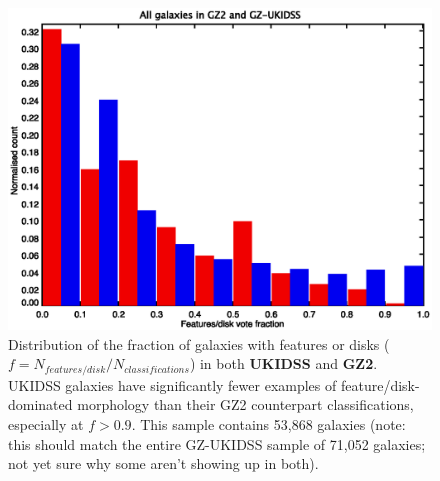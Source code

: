 \documentclass[useAMS,usenatbib]{mn2e}
\begin{document}

\begin{figure}
\includegraphics[scale=1.0]{figures/features_histogram.eps}
\caption{
    Distribution of the fraction of galaxies with features or disks ($f = N_{features/disk}/N_{classifications}$) in both {\bf\color{red}UKIDSS} and {\bf\color{blue}GZ2}. UKIDSS galaxies have significantly fewer examples of feature/disk-dominated morphology than their GZ2 counterpart classifications, especially at $f>0.9$. This sample contains 53,868 galaxies (note: this should match the entire GZ-UKIDSS sample of 71,052 galaxies; not yet sure why some aren't showing up in both). 
}
\label{fig:features_histogram}
\end{figure}
\end{document}
